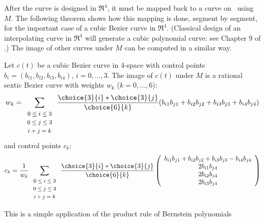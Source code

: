 After the curve is designed in $\Re^4$, it must be mapped back to a curve
on \ using $M$.
The following theorem shows how this mapping is done, segment by segment,
for the important case of a cubic Bezier curve in $\Re^4$.
(Classical design of an interpolating curve in $\Re^4$ will generate
a cubic polynomial curve: see Chapter 9 of \cite{farin97}.)
The image of other curves under $M$ can be computed in a similar way.

\begin{theorem}
\label{sextic}
Let $c(t)$ be a cubic Bezier curve in 4-space with
control points $b_i = (b_{i1},b_{i2},b_{i3},b_{i4})$, $i=0,\ldots,3$.
The image of $c(t)$ under $M$ is a rational sextic Bezier curve with 
weights $w_k$ ($k = 0, \ldots, 6$):
\begin{equation}
\label{eq:weights}
w_k = \sum_{\begin{array}{c} \mbox{\footnotesize{$0 \leq i \leq 3$}} \\ 
			     \mbox{\footnotesize{$0 \leq j \leq 3$}} \\ 
			     \mbox{\footnotesize{$i+j=k$}}
			     \end{array}}
        \frac{\choice{3}{i} * \choice{3}{j}}{\choice{6}{k}}
	(b_{i1} b_{j1} + b_{i2} b_{j2} + b_{i3} b_{j3} + b_{i4} b_{j4})
\end{equation}
and control points $c_k$:
\begin{equation}
\label{eq:control-pts}
c_k = \frac{1}{w_k} 
      \sum_{\begin{array}{c} \mbox{\footnotesize{$0 \leq i \leq 3$}} \\ 
			     \mbox{\footnotesize{$0 \leq j \leq 3$}} \\ 
			     \mbox{\footnotesize{$i+j=k$}}
			     \end{array}} 
        \frac{\choice{3}{i} * \choice{3}{j}}{\choice{6}{k}}
	\left( \begin{array}{c}
            b_{i1} b_{j1} + b_{i2} b_{j2} + b_{i3} b_{j3} - b_{i4} b_{j4} \\
            2b_{i1} b_{j4} \\
            2b_{i2} b_{j4} \\
            2b_{i3} b_{j4} 
	\end{array} \right)
\end{equation}
\end{theorem}
\prf
This is a simple application of the product rule of Bernstein polynomials
